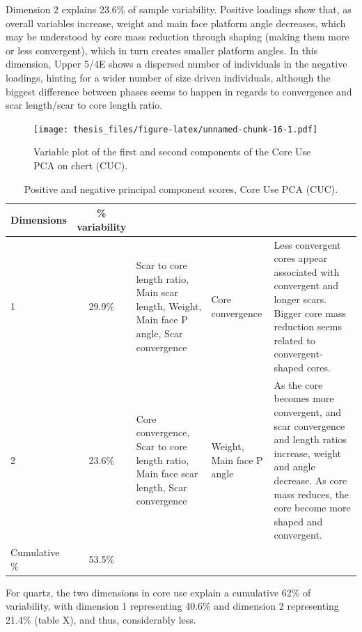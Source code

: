 \documentclass[12pt,twoside]{reedthesis}
\begin{document}
Dimension 2 explains 23.6\% of sample variability. Positive loadings show that, as overall variables increase, weight and main face platform angle decreases, which may be understood by core mass reduction through shaping (making them more or less convergent), which in turn creates smaller platform angles. In this dimension, Upper 5/4E shows a dispersed number of individuals in the negative loadings, hinting for a wider number of size driven individuals, although the biggest difference between phases seems to happen in regards to convergence and scar length/scar to core length ratio.
\begin{figure}
\centering
\texttt{[image: thesis\_files/figure-latex/unnamed-chunk-16-1.pdf]}
\caption{\label{fig:unnamed-chunk-16}Variable plot of the first and second components of the Core Use PCA on chert (CUC).}
\end{figure}
\begin{table}[!h]

\caption{\label{tab:unnamed-chunk-17}Positive and negative principal component scores, Core Use PCA (CUC).}
\centering
\begin{tabular}[t]{lc>{\raggedright\arraybackslash}p{3cm}>{\raggedright\arraybackslash}p{3cm}>{\raggedright\arraybackslash}p{3cm}}
\toprule
\multicolumn{1}{c}{\textbf{Dimensions}} & \multicolumn{1}{c}{\textbf{\% variability}} & \multicolumn{1}{>{\centering\arraybackslash}p{3cm}}{\textbf{+}} & \multicolumn{1}{>{\centering\arraybackslash}p{3cm}}{\textbf{-}} & \multicolumn{1}{>{\centering\arraybackslash}p{3cm}}{\textbf{Interpretation}}\\
\midrule
1 & 29.9\% & Scar to core length ratio, Main scar length, Weight, Main face P angle, Scar convergence & Core convergence & Less convergent cores appear associated with convergent and longer scars. Bigger core mass reduction seems related to convergent-shaped cores.\\
2 & 23.6\% & Core convergence, Scar to core length ratio, Main face scar length, Scar convergence & Weight, Main face P angle & As the core becomes more convergent, and scar convergence and length ratios increase, weight and angle decrease. As core mass reduces, the core become more shaped and convergent.\\
Cumulative \% & 53.5\% &  &  & \\
\bottomrule
\end{tabular}
\end{table}
For quartz, the two dimensions in core use explain a cumulative 62\% of variability, with dimension 1 representing 40.6\% and dimension 2 representing 21.4\% (table X), and thus, considerably less.
\end{document}
